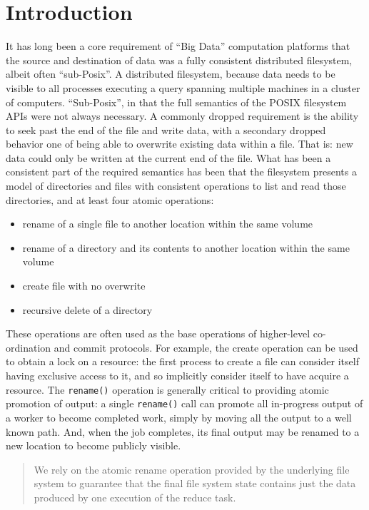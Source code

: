 \documentclass[9pt,technote]{IEEEtran}
\begin{document}
\section{Introduction}
It has long been a core requirement of ``Big Data'' computation platforms that the source and destination of data was a fully consistent distributed filesystem, albeit often ``sub-Posix''.
A distributed filesystem, because data needs to be visible to all processes executing a query spanning multiple machines in a cluster of computers.
``Sub-Posix'', in that the full semantics of the POSIX filesystem APIs were not always necessary.
A commonly dropped requirement is the ability to seek past the end of the file and write data, with a secondary dropped behavior one of being able to overwrite existing data within a file.
That is: new data could only be written at the current end of the file.
What has been a consistent part of the required semantics has been that the filesystem presents a model of directories and files with consistent operations to list and read those directories, and at least four atomic operations:
\begin{itemize}
  \item{rename of a single file to another location within the same volume}
  \item{rename of a directory and its contents to another location within the same volume}
  \item{create file with no overwrite}
  \item{recursive delete of a directory}
\end{itemize}
These operations are often used as the base operations of higher-level co-ordination and commit protocols.
For example, the create operation can be used to obtain a lock on a resource: the first process to create a file can consider itself having exclusive access to it, and so implicitly consider itself to have acquire a resource.
The \texttt{rename()} operation is generally critical to providing atomic promotion of output: a single \texttt{rename()} call can promote all in-progress output of a worker to become completed work, simply by moving all the output to a well known path.
And, when the job completes, its final output may be renamed to a new location to become publicly visible.
\begin{quote}
  We rely on the atomic rename operation provided by the underlying file system to guarantee that the final file system state contains just the data produced by one execution of the reduce task.
\end{quote}
\cite{Dean:2004:MSD:1251254.1251264}
\end{document}
